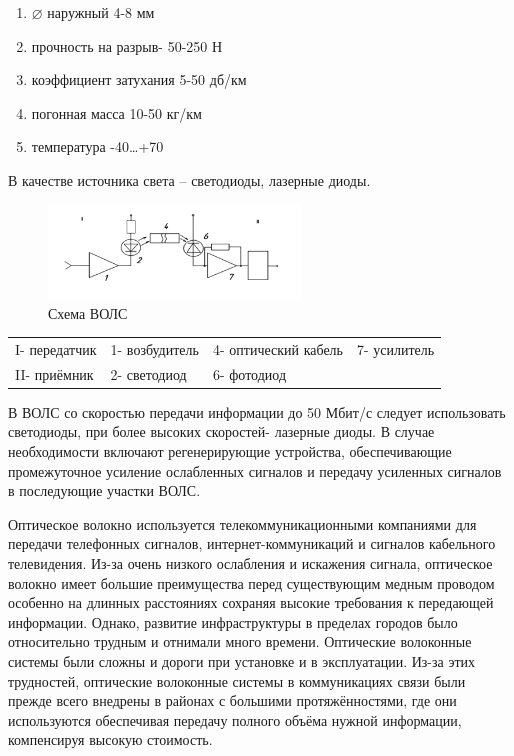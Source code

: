\documentclass[unicode, 12pt, a4paper, oneside]{article}
\begin{document}
\begin{enumerate} 
\item $\varnothing$ наружный  4-8 мм
\item прочность на разрыв- 50-250 Н
\item коэффициент затухания 5-50 дб/км
\item погонная масса 10-50 кг/км
\item температура -40…+70 \textcelsius
\end{enumerate}
В качестве источника света – светодиоды, лазерные диоды.

\begin{figure}[H]
\centering
\includegraphics[width=0.6\textwidth]{77_sxema.png}
\caption{Схема ВОЛС}
\end{figure}

\begin{tabular}{llll}
I- передатчик &  1- возбудитель  & 4- оптический кабель & 7- усилитель \\ 
II- приёмник &  2- светодиод &  6- фотодиод  &  \\ 
\end{tabular} 

В ВОЛС со скоростью передачи информации до 50 Мбит/с следует использовать светодиоды, при более высоких скоростей- лазерные диоды. В случае необходимости включают регенерирующие устройства, обеспечивающие промежуточное усиление ослабленных сигналов и передачу усиленных сигналов в последующие участки ВОЛС.

Оптическое волокно используется телекоммуникационными компаниями для передачи телефонных сигналов, интернет-коммуникаций и сигналов кабельного телевидения. Из-за очень низкого ослабления и искажения сигнала, оптическое волокно имеет большие преимущества перед существующим медным проводом особенно на длинных расстояниях сохраняя высокие требования к передающей информации. Однако, развитие инфраструктуры в пределах городов было относительно трудным и отнимали много времени. Оптические волоконные системы были сложны и дороги при установке и в эксплуатации. Из-за этих трудностей, оптические волоконные системы в коммуникациях связи были прежде всего внедрены в районах с большими протяжённостями, где они используются обеспечивая передачу полного объёма нужной информации, компенсируя высокую стоимость.
\end{document}
